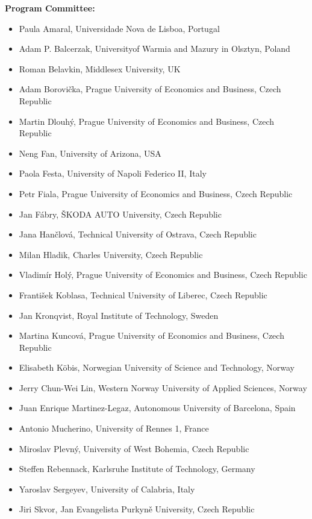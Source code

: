 \textbf{Program Committee:}
\begin{itemize}[nosep]
     \item Paula Amaral, Universidade Nova de Lisboa, Portugal
     \item Adam P. Balcerzak, Universityof Warmia and Mazury in Olsztyn, Poland
     \item Roman Belavkin, Middlesex University, UK
     \item Adam Borovička, Prague University of Economics and Business, Czech Republic
     \item Martin Dlouhý, Prague University of Economics and Business, Czech Republic
     \item Neng Fan, University of Arizona, USA
     \item Paola Festa, University of Napoli Federico II, Italy
     \item Petr Fiala, Prague University of Economics and Business, Czech Republic
     \item Jan Fábry, ŠKODA AUTO University, Czech Republic
     \item Jana Hančlová, Technical University of Ostrava, Czech Republic
     \item Milan Hladik, Charles University, Czech Republic
     \item Vladimír Holý, Prague University of Economics and Business, Czech Republic
     \item František Koblasa, Technical University of Liberec, Czech Republic
     \item Jan Kronqvist, Royal Institute of Technology, Sweden
     \item Martina Kuncová, Prague University of Economics and Business, Czech Republic
     \item Elisabeth Köbis, Norwegian University of Science and Technology, Norway
     \item Jerry Chun-Wei Lin, Western Norway University of Applied Sciences, Norway
     \item Juan Enrique Martinez-Legaz, Autonomous University of Barcelona, Spain
     \item Antonio Mucherino, University of Rennes 1, France
     \item Miroslav Plevný, University of West Bohemia, Czech Republic
     \item Steffen Rebennack, Karlsruhe Institute of Technology, Germany
     \item Yaroslav Sergeyev, University of Calabria, Italy
     \item Jiri Skvor, Jan Evangelista Purkyně University, Czech Republic

\end{itemize}
